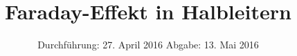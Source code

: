 

\subject{Fortgeschrittenen Praktikum - V46}
\title{Faraday-Effekt in Halbleitern}
\date{
  Durchführung: 27. April 2016
  \hspace{3em}
  Abgabe: 13. Mai 2016
}



\maketitle
\thispagestyle{empty}
\tableofcontents
\newpage






\printbibliography


